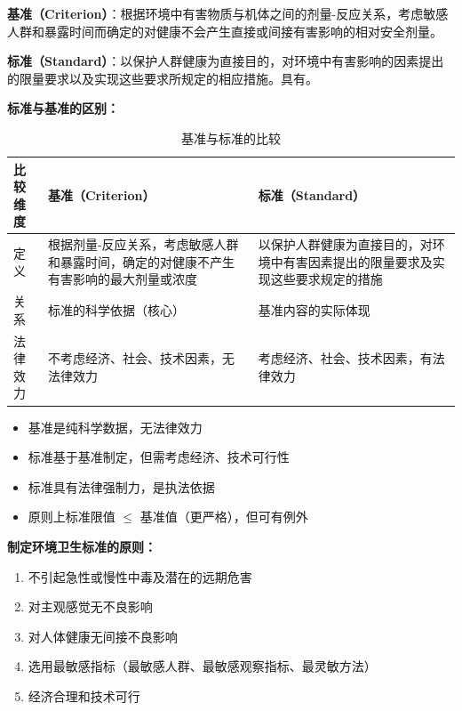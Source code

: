 \documentclass[10pt,a4paper,oneside]{ctexbook}
\begin{document}
\begin{defbox}
\textbf{基准（Criterion）}：根据环境中有害物质与机体之间的剂量-反应关系，考虑敏感人群和暴露时间而确定的对健康不会产生直接或间接有害影响的相对安全剂量。

\textbf{标准（Standard）}：以保护人群健康为直接目的，对环境中有害影响的因素提出的限量要求以及实现这些要求所规定的相应措施。具有。
\end{defbox}

\begin{keybox}
\textbf{标准与基准的区别：}

\begin{table}[H]
\centering
\caption{基准与标准的比较}
\begin{tabularx}{\textwidth}{lXX}
\hline
\textbf{比较维度} & \textbf{基准（Criterion）} & \textbf{标准（Standard）} \\
\hline
定义 & 根据剂量-反应关系，考虑敏感人群和暴露时间，确定的对健康不产生有害影响的最大剂量或浓度 & 以保护人群健康为直接目的，对环境中有害因素提出的限量要求及实现这些要求规定的措施 \\
关系 & 标准的科学依据（核心） & 基准内容的实际体现 \\
法律效力 & 不考虑经济、社会、技术因素，无法律效力 & 考虑经济、社会、技术因素，有法律效力 \\
\hline
\end{tabularx}
\end{table}

\begin{itemize}[leftmargin=*]
    \item 基准是纯科学数据，无法律效力
    \item 标准基于基准制定，但需考虑经济、技术可行性
    \item 标准具有法律强制力，是执法依据
    \item 原则上标准限值 $\leq$ 基准值（更严格），但可有例外
\end{itemize}
\end{keybox}

\textbf{制定环境卫生标准的原则：}
\begin{enumerate}[leftmargin=*]
    \item 不引起急性或慢性中毒及潜在的远期危害
    \item 对主观感觉无不良影响
    \item 对人体健康无间接不良影响
    \item 选用最敏感指标（最敏感人群、最敏感观察指标、最灵敏方法）
    \item 经济合理和技术可行
\end{enumerate}
\end{document}
